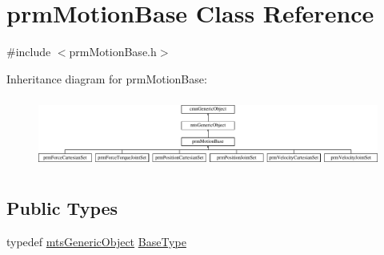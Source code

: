\hypertarget{classprm_motion_base}{\section{prm\-Motion\-Base Class Reference}
\label{classprm_motion_base}
}


{\ttfamily \#include $<$prm\-Motion\-Base.\-h$>$}

Inheritance diagram for prm\-Motion\-Base\-:\begin{figure}[H]
\begin{center}
\leavevmode
\includegraphics[height=2.348008cm]{db/d1f/classprm_motion_base}
\end{center}
\end{figure}
\subsection*{Public Types}
\begin{DoxyCompactItemize}
\item 
typedef \hyperlink{classmts_generic_object}{mts\-Generic\-Object} \hyperlink{classprm_motion_base_aef2350979e92dcdd61088ee026a8b87b}{Base\-Type}
\end{DoxyCompactItemize}
